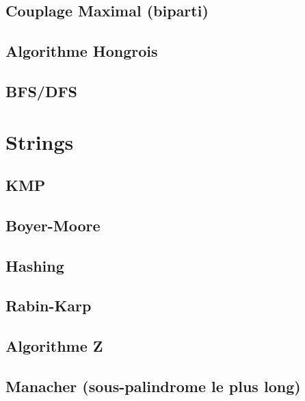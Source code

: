\documentclass[10pt]{extarticle}
\begin{document}
\subsection{Couplage Maximal (biparti)}
{\scriptsize}

\subsection{Algorithme Hongrois}
{\scriptsize}

\subsection{BFS/DFS}
{\scriptsize}


\section{Strings}
\subsection{KMP}
{\scriptsize}

\subsection{Boyer-Moore}
{\scriptsize}

\subsection{Hashing}
{\scriptsize}

\subsection{Rabin-Karp}
{\scriptsize}

\subsection{Algorithme Z}
{\scriptsize}

\subsection{Manacher (sous-palindrome le plus long)}
{\scriptsize}
\end{document}
